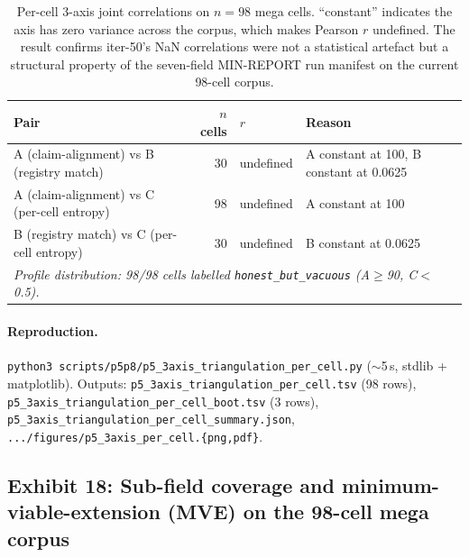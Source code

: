 \documentclass{article}  \usepackage[preprint,nonatbib]{neurips_2026} \usepackage[numbers]{natbib}
\begin{document}
\begin{table}[t]
\centering\small
\caption{Per-cell 3-axis joint correlations on $n{=}98$ mega cells.
``constant'' indicates the axis has zero variance across the corpus,
which makes Pearson $r$ undefined. The result confirms iter-50's NaN
correlations were not a statistical artefact but a structural property
of the seven-field MIN-REPORT run manifest on the current 98-cell corpus.}
\label{tab:p5-3axis-degenerate}
\begin{tabular}{lrll}
\toprule
Pair & $n$ cells & $r$ & Reason \\
\midrule
A (claim-alignment) vs B (registry match)    &  30 & undefined & A constant at 100, B constant at 0.0625 \\
A (claim-alignment) vs C (per-cell entropy)  &  98 & undefined & A constant at 100 \\
B (registry match) vs C (per-cell entropy)   &  30 & undefined & B constant at 0.0625 \\
\midrule
\multicolumn{4}{l}{\emph{Profile distribution: 98/98 cells labelled
\texttt{honest\_but\_vacuous} (A$\geq$90, C$<$0.5).}} \\
\bottomrule
\end{tabular}
\end{table}

\paragraph{Reproduction.}
\texttt{python3 scripts/p5p8/p5\_3axis\_triangulation\_per\_cell.py}
($\sim$5\,s, stdlib + matplotlib). Outputs:
\texttt{p5\_3axis\_triangulation\_per\_cell.tsv} (98 rows),
\texttt{p5\_3axis\_triangulation\_per\_cell\_boot.tsv} (3 rows),
\texttt{p5\_3axis\_triangulation\_per\_cell\_summary.json},
\texttt{.../figures/p5\_3axis\_per\_cell.\{png,pdf\}}.

\subsection{Exhibit 18: Sub-field coverage and minimum-viable-extension (MVE) on the 98-cell mega corpus}
\label{sec:p5-subfield-audit}
\end{document}
